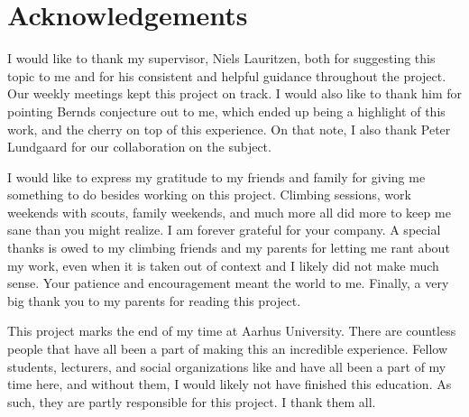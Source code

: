 \section*{Acknowledgements}
I would like to thank my supervisor, Niels Lauritzen, both for suggesting this topic to me and for his consistent and helpful guidance throughout the project. Our weekly meetings kept this project on track. I would also like to thank him for pointing Bernds conjecture out to me, which ended up being a highlight of this work, and the cherry on top of this experience. On that note, I also thank Peter Lundgaard for our collaboration on the subject.

I would like to express my gratitude to my friends and family for giving me something to do besides working on this project. Climbing sessions, work weekends with scouts, family weekends, and much more all did more to keep me sane than you might realize. I am forever grateful for your company. A special thanks is owed to my climbing friends and my parents for letting me rant about my work, even when it is taken out of context and I likely did not make much sense. Your patience and encouragement meant the world to me. Finally, a very big thank you to my parents for reading this project.

This project marks the end of my time at Aarhus University. There are countless people that have all been a part of making this an incredible experience. Fellow students, lecturers, and social organizations like  and \TKET{} have all been a part of my time here, and without them, I would likely not have finished this education. As such, they are partly responsible for this project. I thank them all.
